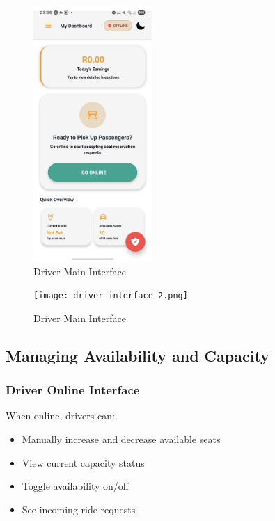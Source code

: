 \documentclass[12pt]{article}
\begin{document}
\begin{figure}[H]
  \centering
  \includegraphics[width=0.4\textwidth]{driver_interface.png}
  \caption{Driver Main Interface}
\end{figure}

\begin{figure}[H]
  \centering
  \texttt{[image: driver\_interface\_2.png]}
  \caption{Driver Main Interface}
\end{figure}

\subsection{Managing Availability and Capacity}

\subsubsection{Driver Online Interface}
When online, drivers can:
\begin{itemize}
    \item Manually increase and decrease available seats
    \item View current capacity status
    \item Toggle availability on/off
    \item See incoming ride requests
\end{itemize}
\end{document}
